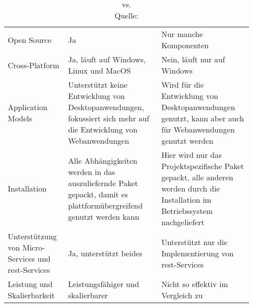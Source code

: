 	\newpage

	\begin{xltabular}{\textwidth}{@{}|p{0.23\textwidth}|X|X|@{}}
		\caption[ vs. ]
		{ vs. \\
		Quelle: }
		\label{tab:netcorevsnetframework}
		\\
		\hline
		&  & 
		\\\hline\hline
		\endfirsthead
		Open Source & Ja & Nur manche Komponenten
		\\\hline
		Cross-Platform & Ja, läuft auf Windows, Linux und MacOS & Nein, läuft nur auf Windows
		\\\hline
		Application Models
		& Unterstützt keine Entwicklung von Desktopanwendungen, fokussiert sich mehr auf die Entwicklung von Webanwendungen
		& Wird für die Entwicklung von Desktopanwendungen genutzt, kann aber auch für Webanwendungen genutzt werden
		\\\hline
		Installation
		& Alle Abhängigkeiten werden in das auszuliefernde Paket gepackt, damit es plattformübergreifend genutzt werden kann
		& Hier wird nur das Projektspezifische Paket gepackt, alle anderen werden durch die Installation im Betriebssystem nachgeliefert
		\\\hline
		Unterstützung von Micro-Services und \gls{rest}-Services
		& Ja, unterstützt beides
		& Unterstützt nur die Implementierung von \gls{rest}-Services
		\\\hline
		Leistung und Skalierbarkeit
		& Leistungsfähiger und skalierbarer
		& Nicht so effektiv im Vergleich zu \nameref{subsubsec:netcore21}
		\\\hline
	\end{xltabular}

	\newpage

